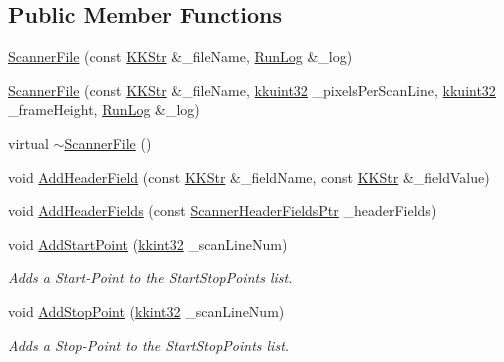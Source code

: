 \subsection*{Public Member Functions}
\begin{DoxyCompactItemize}
\item 
\hyperlink{class_k_k_l_s_c_1_1_scanner_file_a252cce5d981908fa83c60e28eba9bdb1}{Scanner\+File} (const \hyperlink{class_k_k_b_1_1_k_k_str}{K\+K\+Str} \&\+\_\+file\+Name, \hyperlink{class_k_k_b_1_1_run_log}{Run\+Log} \&\+\_\+log)
\item 
\hyperlink{class_k_k_l_s_c_1_1_scanner_file_a4f76018de231ba95742df9faf9fe79e8}{Scanner\+File} (const \hyperlink{class_k_k_b_1_1_k_k_str}{K\+K\+Str} \&\+\_\+file\+Name, \hyperlink{namespace_k_k_b_af8d832f05c54994a1cce25bd5743e19a}{kkuint32} \+\_\+pixels\+Per\+Scan\+Line, \hyperlink{namespace_k_k_b_af8d832f05c54994a1cce25bd5743e19a}{kkuint32} \+\_\+frame\+Height, \hyperlink{class_k_k_b_1_1_run_log}{Run\+Log} \&\+\_\+log)
\item 
virtual \hyperlink{class_k_k_l_s_c_1_1_scanner_file_af702fcd8e528602906921f51b3cbd522}{$\sim$\+Scanner\+File} ()
\item 
void \hyperlink{class_k_k_l_s_c_1_1_scanner_file_ac4eaa07d0cfdeb4300920012b354e42c}{Add\+Header\+Field} (const \hyperlink{class_k_k_b_1_1_k_k_str}{K\+K\+Str} \&\+\_\+field\+Name, const \hyperlink{class_k_k_b_1_1_k_k_str}{K\+K\+Str} \&\+\_\+field\+Value)
\item 
void \hyperlink{class_k_k_l_s_c_1_1_scanner_file_a9d866a2201de667e09b8329341e488e0}{Add\+Header\+Fields} (const \hyperlink{namespace_k_k_l_s_c_a7c06efc9062d7120e1fbf26f44ce4089}{Scanner\+Header\+Fields\+Ptr} \+\_\+header\+Fields)
\item 
void \hyperlink{class_k_k_l_s_c_1_1_scanner_file_aef1ff86c3236abd442a15364fe5b6688}{Add\+Start\+Point} (\hyperlink{namespace_k_k_b_a8fa4952cc84fda1de4bec1fbdd8d5b1b}{kkint32} \+\_\+scan\+Line\+Num)
\begin{DoxyCompactList}\small\item\em Adds a Start-\/\+Point to the \textquotesingle{}Start\+Stop\+Points\textquotesingle{} list. \end{DoxyCompactList}\item 
void \hyperlink{class_k_k_l_s_c_1_1_scanner_file_a2ceb06a905067839a308791d958841e9}{Add\+Stop\+Point} (\hyperlink{namespace_k_k_b_a8fa4952cc84fda1de4bec1fbdd8d5b1b}{kkint32} \+\_\+scan\+Line\+Num)
\begin{DoxyCompactList}\small\item\em Adds a Stop-\/\+Point to the \textquotesingle{}Start\+Stop\+Points\textquotesingle{} list. \end{DoxyCompactList}\item 

\end{DoxyCompactItemize}
